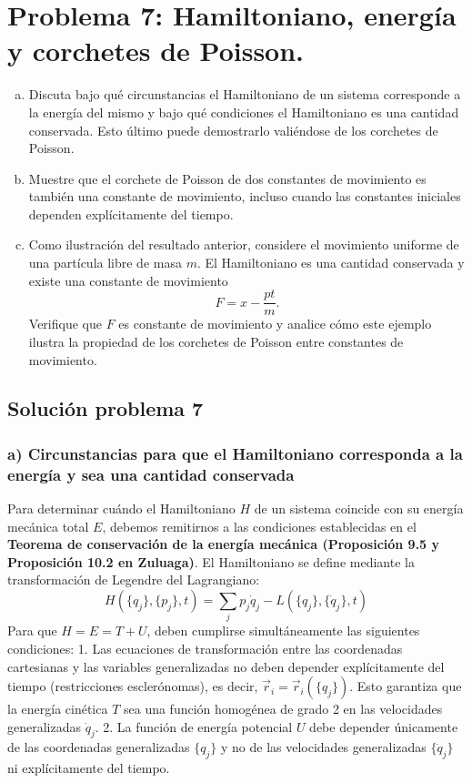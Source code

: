 \documentclass[a4paper]{article}
\begin{document}
\section{Problema 7: Hamiltoniano, energía y corchetes de Poisson.}

\begin{enumerate}[a)]
    \item Discuta bajo qué circunstancias el Hamiltoniano de un sistema corresponde a la energía del mismo y bajo qué condiciones el Hamiltoniano es una cantidad conservada. Esto último puede demostrarlo valiéndose de los corchetes de Poisson.
    
    \item Muestre que el corchete de Poisson de dos constantes de movimiento es también una constante de movimiento, incluso cuando las constantes iniciales dependen explícitamente del tiempo.
    
    \item Como ilustración del resultado anterior, considere el movimiento uniforme de una partícula libre de masa $m$. El Hamiltoniano es una cantidad conservada y existe una constante de movimiento
    $$F = x - \frac{pt}{m}.$$
    Verifique que $F$ es constante de movimiento y analice cómo este ejemplo ilustra la propiedad de los corchetes de Poisson entre constantes de movimiento.
\end{enumerate}

\subsection{Solución problema 7}

\subsubsection*{a) Circunstancias para que el Hamiltoniano corresponda a la energía y sea una cantidad conservada}

Para determinar cuándo el Hamiltoniano $H$ de un sistema coincide con su energía mecánica total $E$, debemos remitirnos a las condiciones establecidas en el \textbf{Teorema de conservación de la energía mecánica (Proposición 9.5 y Proposición 10.2 en Zuluaga)}. El Hamiltoniano se define mediante la transformación de Legendre del Lagrangiano:
$$H(\{q_j\}, \{p_j\}, t) = \sum_j p_j \dot{q}_j - L(\{q_j\}, \{\dot{q}_j\}, t)$$
Para que $H = E = T + U$, deben cumplirse simultáneamente las siguientes condiciones:
1. Las ecuaciones de transformación entre las coordenadas cartesianas y las variables generalizadas no deben depender explícitamente del tiempo (restricciones esclerónomas), es decir, $\vec{r}_i = \vec{r}_i(\{q_j\})$. Esto garantiza que la energía cinética $T$ sea una función homogénea de grado 2 en las velocidades generalizadas $\dot{q}_j$.
2. La función de energía potencial $U$ debe depender únicamente de las coordenadas generalizadas $\{q_j\}$ y no de las velocidades generalizadas $\{\dot{q}_j\}$ ni explícitamente del tiempo.
\end{document}
